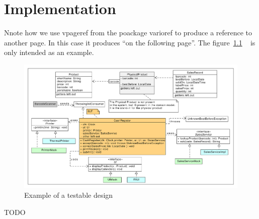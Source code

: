 \chapter{Implementation}


Nnote how we use vpageref from the poackage varioref to produce
a reference to another page. In this case it produces ``on the
following page''.
The figure~\ref{fig:testable-design} ~ is only intended as an example.

\begin{figure}[t]
  \includegraphics[width=\linewidth]{images/testable-design.pdf}
  \caption{\label{fig:testable-design}
    Example of a testable design}
\end{figure}

TODO
